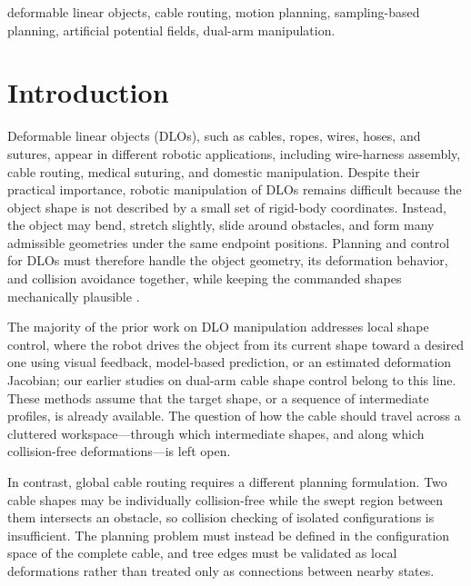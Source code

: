 \documentclass{pas}
\begin{document}
\begin{keywords} deformable linear objects, cable routing, motion planning,
sampling-based planning, artificial potential fields, dual-arm manipulation.
\end{keywords}


\maketitle


\section{Introduction}
\label{sec:introduction}

Deformable linear objects (DLOs), such as cables, ropes, wires, hoses, and sutures, appear in different robotic applications, including wire-harness assembly, cable routing, medical suturing, and domestic manipulation. Despite their practical importance, robotic manipulation of DLOs remains difficult because the object shape is not described by a small set of rigid-body coordinates. Instead, the object may bend, stretch slightly, slide around obstacles, and form many admissible geometries under the same endpoint positions. Planning and control for DLOs must therefore handle the object geometry, its deformation behavior, and collision avoidance together, while keeping the commanded shapes mechanically plausible \citep{Sanchez2018Survey,Yin2021Survey,Zhu2022ChallengesOutlook,Caporali2026Survey}.

The majority of the prior work on DLO manipulation addresses local shape control, where the robot drives the object from its current shape toward a desired one using visual feedback, model-based prediction, or an estimated deformation Jacobian; our earlier studies on dual-arm cable shape control \citep{AlmaghoutKlimchik2022PlanarShapeControl,AlmaghoutKlimchik2022VFP,AlmaghoutKlimchik2024CableShapeControl,AlmaghoutCherubiniKlimchik2024LargeDeformation} belong to this line. These methods assume that the target shape, or a sequence of intermediate profiles, is already available. The question of how the cable should travel across a cluttered workspace---through which intermediate shapes, and along which collision-free deformations---is left open.

In contrast, global cable routing requires a different planning formulation. Two cable shapes may be individually collision-free while the swept region between them intersects an obstacle, so collision checking of isolated configurations is insufficient. The planning problem must instead be defined in the configuration space of the complete cable, and tree edges must be validated as local deformations rather than treated only as connections between nearby states.
\end{document}
